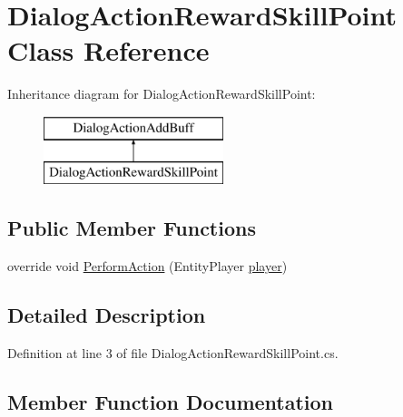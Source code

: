 \hypertarget{class_dialog_action_reward_skill_point}{}\section{Dialog\+Action\+Reward\+Skill\+Point Class Reference}
\label{class_dialog_action_reward_skill_point}
Inheritance diagram for Dialog\+Action\+Reward\+Skill\+Point\+:\begin{figure}[H]
\begin{center}
\leavevmode
\includegraphics[height=2.000000cm]{df/dc8/class_dialog_action_reward_skill_point}
\end{center}
\end{figure}
\subsection*{Public Member Functions}
\begin{DoxyCompactItemize}
\item 
override void \mbox{\hyperlink{class_dialog_action_reward_skill_point_a36938e31a21c430b2cd14866a1ebe95f}{Perform\+Action}} (Entity\+Player \mbox{\hyperlink{_sphere_i_i_01_music_01_boxes_2_config_2_localization_8txt_a4e2cb8aeff651600ea1cc57fe5a929a4}{player}})
\end{DoxyCompactItemize}


\subsection{Detailed Description}


Definition at line 3 of file Dialog\+Action\+Reward\+Skill\+Point.\+cs.



\subsection{Member Function Documentation}
\mbox{\label{class_dialog_action_reward_skill_point_a36938e31a21c430b2cd14866a1ebe95f}} 
